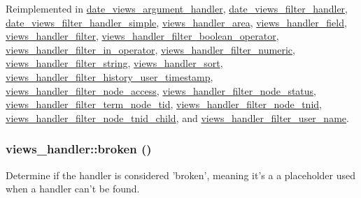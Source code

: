 Reimplemented in \hyperlink{classdate__views__argument__handler_a628ee4d992b0417645e0aafeeb733b28}{date\_\-views\_\-argument\_\-handler}, \hyperlink{classdate__views__filter__handler_a214c46a8a095cad6ac6159cbedbb4f35}{date\_\-views\_\-filter\_\-handler}, \hyperlink{classdate__views__filter__handler__simple_a0eb855c3f94765f6295868b81a27b9c3}{date\_\-views\_\-filter\_\-handler\_\-simple}, \hyperlink{classviews__handler__area_a859db27dfc7636cba49b95c2c8920e19}{views\_\-handler\_\-area}, \hyperlink{classviews__handler__field_a984d6ce9f6401260fca2d4673b27ae76}{views\_\-handler\_\-field}, \hyperlink{classviews__handler__filter_a655263cd0b73188eec064b9a9743fe4c}{views\_\-handler\_\-filter}, \hyperlink{classviews__handler__filter__boolean__operator_a7b58a9b58ae9778383b6a215834d7cdb}{views\_\-handler\_\-filter\_\-boolean\_\-operator}, \hyperlink{classviews__handler__filter__in__operator_a2c17bde9b5cb3498d31786ba888d545c}{views\_\-handler\_\-filter\_\-in\_\-operator}, \hyperlink{classviews__handler__filter__numeric_aaece85d3c36d4186c871cc55e636f4f2}{views\_\-handler\_\-filter\_\-numeric}, \hyperlink{classviews__handler__filter__string_a3152b0f2ce38cf493327e2a91b9c9f5e}{views\_\-handler\_\-filter\_\-string}, \hyperlink{classviews__handler__sort_a94271a6ce69bf4acb37047b01f0decaa}{views\_\-handler\_\-sort}, \hyperlink{classviews__handler__filter__history__user__timestamp_aa5eeead15fcc3d6e74ca62c31676e109}{views\_\-handler\_\-filter\_\-history\_\-user\_\-timestamp}, \hyperlink{classviews__handler__filter__node__access_a2f3abe4aa9418904e52937d1549fd560}{views\_\-handler\_\-filter\_\-node\_\-access}, \hyperlink{classviews__handler__filter__node__status_afad09e6f2c94d8f6748b48c3ce137a25}{views\_\-handler\_\-filter\_\-node\_\-status}, \hyperlink{classviews__handler__filter__term__node__tid_a392046588b13b1b76223eb22ba4ff660}{views\_\-handler\_\-filter\_\-term\_\-node\_\-tid}, \hyperlink{classviews__handler__filter__node__tnid_a037932cf19297e4b8544c24747509823}{views\_\-handler\_\-filter\_\-node\_\-tnid}, \hyperlink{classviews__handler__filter__node__tnid__child_a3762760577c3801276a683271be90e47}{views\_\-handler\_\-filter\_\-node\_\-tnid\_\-child}, and \hyperlink{classviews__handler__filter__user__name_aba7659d0d6c937d9c346e8ed3af532b6}{views\_\-handler\_\-filter\_\-user\_\-name}.\hypertarget{classviews__handler_ac1cd2ff30cb558c79cc908be516fb725}{
\subsubsection[{broken}]{\setlength{\rightskip}{0pt plus 5cm}views\_\-handler::broken ()}}
\label{classviews__handler_ac1cd2ff30cb558c79cc908be516fb725}
Determine if the handler is considered 'broken', meaning it's a a placeholder used when a handler can't be found. 


